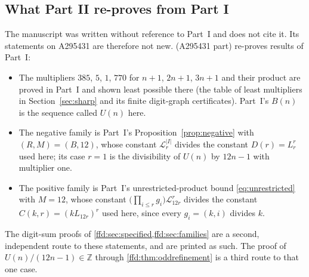 \documentclass[11pt]{article}
\theoremstyle{definition}
\theoremstyle{remark}
\newcommand{\Z}{\mathbb Z}
\newcommand{\LL}{\mathcal L}
\begin{document}
\subsection{What Part II re-proves from Part I}\label{ffd:sec:overlap}
The manuscript was written without reference to Part~I and does not cite
it. Its statements on A295431 are therefore not new.
 (A295431 part) re-proves results of Part~I:
\begin{itemize}[itemsep=2pt]
\item The multipliers $385$, $5$, $1$, $770$ for $n+1$, $2n+1$, $3n+1$ and
  their product are proved in Part~I and shown least possible there (the
  table of least multipliers in Section~\ref{sec:sharp} and its finite
  digit-graph certificates). Part~I's $B(n)$ is the sequence called $U(n)$
  here.
\item The negative family is Part~I's Proposition~\ref{prop:negative} with $(R,M)=(B,12)$,
  whose constant $\LL_r^{|I|}$ divides the constant $D(r)=L_r^r$ used here;
  its case $r=1$ is the divisibility of $U(n)$ by $12n-1$ with multiplier one.
\item The positive family is Part~I's unrestricted-product bound
  \eqref{eq:unrestricted} with $M=12$, whose constant
  $\bigl(\prod_{i\le r}g_i\bigr)\LL_{12r}^r$ divides the constant
  $C(k,r)=(kL_{12r})^r$ used here, since every $g_i=(k,i)$ divides $k$.
\end{itemize}
The digit-sum proofs of \cref{ffd:sec:specified,ffd:sec:families} are a
second, independent route to these statements, and are printed as such. The
proof of $U(n)/(12n-1)\in\Z$ through \cref{ffd:thm:oddrefinement} is a
third route to that one case.
\end{document}
